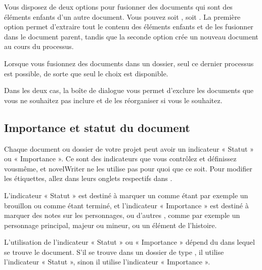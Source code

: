 \documentclass[a4paper,11pt,french]{sphinxmanual}
\begin{document}
\sphinxAtStartPar
Vous disposez de deux options pour fusionner des documents qui sont des éléments enfants d’un autre document. Vous pouvez soit , soit . La première option permet d’extraire tout le contenu des éléments enfants et de les fusionner dans le document parent, tandis que la seconde option crée un nouveau document au cours du processus.

\sphinxAtStartPar
Lorsque vous fusionnez des documents dans un dossier, seul ce dernier processus est possible, de sorte que seul le choix  est disponible.

\sphinxAtStartPar
Dans les deux cas, la boîte de dialogue  vous permet d’exclure les documents que vous ne souhaitez pas inclure et de les réorganiser si vous le souhaitez.


\subsection{Importance et statut du document}
\label{\detokenize{usage_project:document-importance-and-status}}\label{\detokenize{usage_project:a-ui-tree-status}}
\sphinxAtStartPar
Chaque document ou dossier de votre projet peut avoir un indicateur « Statut » ou « Importance ». Ce sont des indicateurs que vous contrôlez et définissez vous\sphinxhyphen{}même, et novelWriter ne les utilise pas pour quoi que ce soit. Pour modifier les étiquettes, allez dans leurs onglets respectifs dans .

\sphinxAtStartPar
L’indicateur « Statut » est destiné à marquer un {\hyperref[\detokenize{int_glossary:term-Novel-Documents}]{}} comme étant par exemple un brouillon ou comme étant terminé, et l’indicateur « Importance » est destiné à marquer des notes sur les personnages, ou d’autres {\hyperref[\detokenize{int_glossary:term-Project-Notes}]{}}, comme par exemple un personnage principal, majeur ou mineur, ou un élément de l’histoire.

\sphinxAtStartPar
L’utilisation de l’indicateur « Statut » ou « Importance » dépend du {\hyperref[\detokenize{int_glossary:term-Root-Folder}]{}} dans lequel se trouve le document. S’il se trouve dans un dossier de type , il utilise l’indicateur « Statut », sinon il utilise l’indicateur « Importance ».
\end{document}
